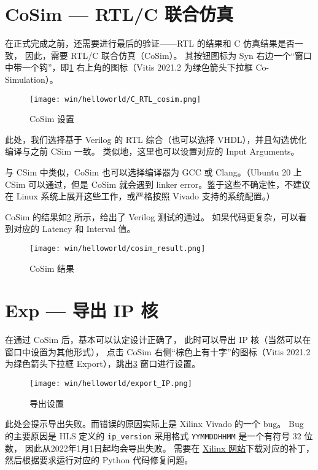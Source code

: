 \documentclass[Chinese,TC,use boldface,simple Names]{beaulivre}
\begin{document}
  \section{CoSim --- RTL/C 联合仿真}

    在正式完成之前，还需要进行最后的验证——RTL 的结果和 C 仿真结果是否一致，
    因此，需要 RTL/C 联合仿真（CoSim）。
    其按钮图标为 Syn 右边一个“窗口中带一个钩”，即\cref{fig:C_RTL_cosim} 右上角的图标（Vitis 2021.2 为绿色箭头下拉框 Co-Simulation）。
    \begin{figure}[htbp]
      \centering
      \texttt{[image: win/helloworld/C\_RTL\_cosim.png]}
      \caption{CoSim 设置}
      \label{fig:C_RTL_cosim}
    \end{figure}

    此处，我们选择基于 Verilog 的 RTL 综合（也可以选择 VHDL），并且勾选优化编译与之前 CSim 一致。
    类似地，这里也可以设置对应的 Input Arguments。
    \begin{tip}
      与 CSim 中类似，CoSim 也可以选择编译器为 GCC 或 Clang。（Ubuntu 20 上 CSim 可以通过，但是 CoSim 就会遇到 linker error。鉴于这些不确定性，不建议在 Linux 系统上展开这些工作，或严格按照 Vivado 支持的系统配置。）
    \end{tip}

    CoSim 的结果如\cref{fig:cosim_result} 所示，给出了 Verilog 测试的通过。
    如果代码更复杂，可以看到对应的 Latency 和 Interval 值。
    \begin{figure}[htbp]
      \centering
      \texttt{[image: win/helloworld/cosim\_result.png]}
      \caption{CoSim 结果}
      \label{fig:cosim_result}
    \end{figure}

  \section{Exp --- 导出 IP 核}

    在通过 CoSim 后，基本可以认定设计正确了，
    此时可以导出 IP 核（当然可以在窗口中设置为其他形式），
    点击 CoSim 右侧“棕色上有十字”的图标（Vitis 2021.2 为绿色箭头下拉框 Export），跳出\cref{fig:export_IP} 窗口进行设置。
    \begin{figure}[htbp]
      \centering
      \texttt{[image: win/helloworld/export\_IP.png]}
      \caption{导出设置}
      \label{fig:export_IP}
    \end{figure}
    \begin{tip}
      此处会提示导出失败。而错误的原因实际上是 Xilinx Vivado 的一个 bug。
      Bug 的主要原因是 HLS 定义的 \texttt{ip\_version} 采用格式 \texttt{YYMMDDHHMM} 是一个有符号 32 位数，
      因此从2022年1月1日起均会导出失败。
      需要在 \href{https://support.xilinx.com/s/article/76960?language=en_US}{Xilinx 网站}下载对应的补丁，
      然后根据要求运行对应的 Python 代码修复问题。
    \end{tip}
    
\end{document}
